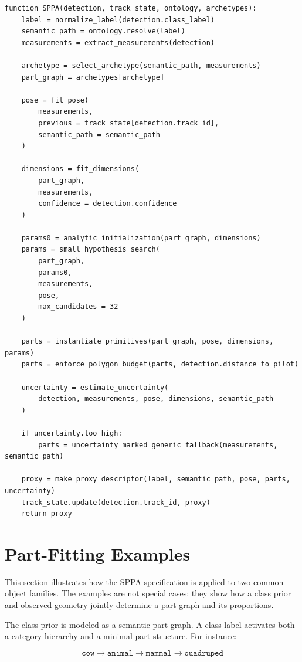 ﻿\documentclass[11pt,a4paper]{article}
\begin{document}
\begin{verbatim}
function SPPA(detection, track_state, ontology, archetypes):
    label = normalize_label(detection.class_label)
    semantic_path = ontology.resolve(label)
    measurements = extract_measurements(detection)

    archetype = select_archetype(semantic_path, measurements)
    part_graph = archetypes[archetype]

    pose = fit_pose(
        measurements,
        previous = track_state[detection.track_id],
        semantic_path = semantic_path
    )

    dimensions = fit_dimensions(
        part_graph,
        measurements,
        confidence = detection.confidence
    )

    params0 = analytic_initialization(part_graph, dimensions)
    params = small_hypothesis_search(
        part_graph,
        params0,
        measurements,
        pose,
        max_candidates = 32
    )

    parts = instantiate_primitives(part_graph, pose, dimensions, params)
    parts = enforce_polygon_budget(parts, detection.distance_to_pilot)

    uncertainty = estimate_uncertainty(
        detection, measurements, pose, dimensions, semantic_path
    )

    if uncertainty.too_high:
        parts = uncertainty_marked_generic_fallback(measurements, semantic_path)

    proxy = make_proxy_descriptor(label, semantic_path, pose, parts, uncertainty)
    track_state.update(detection.track_id, proxy)
    return proxy
\end{verbatim}

\section{Part-Fitting Examples}

This section illustrates how the SPPA specification is applied to two common
object families. The examples are not special cases; they show how a class prior
and observed geometry jointly determine a part graph and its proportions.

The class prior is modeled as a semantic part graph. A class label activates
both a category hierarchy and a minimal part structure. For instance:

\[
\texttt{cow} \rightarrow \texttt{animal} \rightarrow \texttt{mammal}
\rightarrow \texttt{quadruped}
\]
\end{document}
